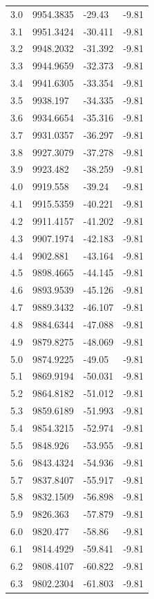 \begin{table}[H]
\begin{tabular}{llll}
3.0 & 9954.3835 & -29.43 & -9.81 \\
3.1 & 9951.3424 & -30.411 & -9.81 \\
3.2 & 9948.2032 & -31.392 & -9.81 \\
3.3 & 9944.9659 & -32.373 & -9.81 \\
3.4 & 9941.6305 & -33.354 & -9.81 \\
3.5 & 9938.197 & -34.335 & -9.81 \\
3.6 & 9934.6654 & -35.316 & -9.81 \\
3.7 & 9931.0357 & -36.297 & -9.81 \\
3.8 & 9927.3079 & -37.278 & -9.81 \\
3.9 & 9923.482 & -38.259 & -9.81 \\
4.0 & 9919.558 & -39.24 & -9.81 \\
4.1 & 9915.5359 & -40.221 & -9.81 \\
4.2 & 9911.4157 & -41.202 & -9.81 \\
4.3 & 9907.1974 & -42.183 & -9.81 \\
4.4 & 9902.881 & -43.164 & -9.81 \\
4.5 & 9898.4665 & -44.145 & -9.81 \\
4.6 & 9893.9539 & -45.126 & -9.81 \\
4.7 & 9889.3432 & -46.107 & -9.81 \\
4.8 & 9884.6344 & -47.088 & -9.81 \\
4.9 & 9879.8275 & -48.069 & -9.81 \\
5.0 & 9874.9225 & -49.05 & -9.81 \\
5.1 & 9869.9194 & -50.031 & -9.81 \\
5.2 & 9864.8182 & -51.012 & -9.81 \\
5.3 & 9859.6189 & -51.993 & -9.81 \\
5.4 & 9854.3215 & -52.974 & -9.81 \\
5.5 & 9848.926 & -53.955 & -9.81 \\
5.6 & 9843.4324 & -54.936 & -9.81 \\
5.7 & 9837.8407 & -55.917 & -9.81 \\
5.8 & 9832.1509 & -56.898 & -9.81 \\
5.9 & 9826.363 & -57.879 & -9.81 \\
6.0 & 9820.477 & -58.86 & -9.81 \\
6.1 & 9814.4929 & -59.841 & -9.81 \\
6.2 & 9808.4107 & -60.822 & -9.81 \\
6.3 & 9802.2304 & -61.803 & -9.81 \\

\end{tabular}
\end{table}
